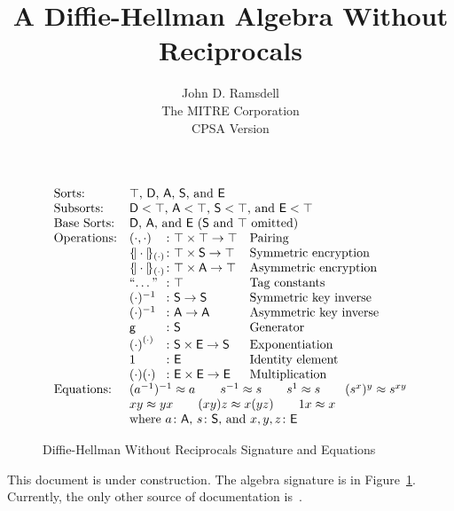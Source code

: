 \documentclass[12pt]{article}
\title{A Diffie-Hellman Algebra Without Reciprocals}
\author{John D. Ramsdell\\
  The MITRE Corporation\\ CPSA Version \version}
\newcommand{\gen}{\ensuremath{\cn{g}}}
\begin{document}
\maketitle
\cpsacopying

\begin{figure}
$$\begin{array}{ll@{{}\colon{}}ll}
\mbox{Sorts:}&\multicolumn{3}{l}{\mbox{$\top$, \srt{D}, \srt{A}, \srt{S}, and \srt{E}}}\\
\mbox{Subsorts:}&\multicolumn{3}{l}{\mbox{$\srt{D}<\top$,
$\srt{A}<\top$, $\srt{S}<\top$, and $\srt{E}<\top$}}\\
\mbox{Base Sorts:}&\multicolumn{3}{l}{\mbox{\srt{D}, \srt{A}, and \srt{E} (\srt{S} and
$\top$ omitted)}}\\
\mbox{Operations:}&(\cdot,\cdot)&\top\times\top\to\top& \mbox{Pairing}\\
&\enc{\cdot}{(\cdot)}&\top\times\srt{S}\to\top& \mbox{Symmetric encryption}\\
&\enc{\cdot}{(\cdot)}&\top\times\srt{A}\to\top& \mbox{Asymmetric encryption}\\
&\mbox{``\ldots''}&\top&\mbox{Tag constants}\\
&(\cdot)^{-1}&\srt{S}\to\srt{S}& \mbox{Symmetric key inverse}\\
&(\cdot)^{-1}&\srt{A}\to\srt{A}& \mbox{Asymmetric key inverse}\\
&\gen&\srt{S}&\mbox{Generator}\\
&{(\cdot)}^{(\cdot)}&\srt{S}\times\srt{E}\to\srt{S}&\mbox{Exponentiation}\\
&1&\srt{E}&\mbox{Identity element}\\
&(\cdot)(\cdot)&\srt{E}\times\srt{E}\to\srt{E}&\mbox{Multiplication}\\
\mbox{Equations:}&\multicolumn{3}{l}{(a^{-1})^{-1}\approx a\qquad
  s^{-1}\approx s\qquad s^1\approx s\qquad (s^x)^y\approx s^{xy}}\\
&\multicolumn{3}{l}{xy\approx yx\qquad
  (xy)z\approx x(yz)\qquad 1x\approx x}\\
&\multicolumn{3}{l}{\mbox{where $a\colon\srt{A}$, $s\colon\srt{S}$,
    and $x,y,z\colon\srt{E}$}}
\end{array}$$
\caption{Diffie-Hellman Without Reciprocals Signature and
  Equations}\label{fig:dh signature}
\end{figure}

This document is under construction.  The algebra signature is in
Figure~\ref{fig:dh signature}.  Currently, the only other source of
documentation is~\cite{cpsauser09}.



\end{document}
